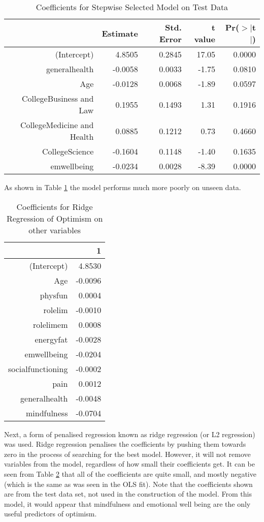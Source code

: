 \documentclass{article}
\begin{document}
\begin{table}[ht]
\centering
\begin{tabular}{rrrrr}
  \hline
 & Estimate & Std. Error & t value & Pr($>$$|$t$|$) \\ 
  \hline
(Intercept) & 4.8505 & 0.2845 & 17.05 & 0.0000 \\ 
  generalhealth & -0.0058 & 0.0033 & -1.75 & 0.0810 \\ 
  Age & -0.0128 & 0.0068 & -1.89 & 0.0597 \\ 
  CollegeBusiness and Law & 0.1955 & 0.1493 & 1.31 & 0.1916 \\ 
  CollegeMedicine and Health & 0.0885 & 0.1212 & 0.73 & 0.4660 \\ 
  CollegeScience & -0.1604 & 0.1148 & -1.40 & 0.1635 \\ 
  emwellbeing & -0.0234 & 0.0028 & -8.39 & 0.0000 \\ 
   \hline
\end{tabular}
\caption{Coefficients for Stepwise Selected Model on Test Data} 
\label{tab:hom1stepopttest}
\end{table}
As shown in Table \ref{tab:hom1stepopttest} the model performs much more poorly on unseen data. 

\begin{table}[ht]
\centering
\begin{tabular}{rr}
  \hline
 & 1 \\ 
  \hline
(Intercept) & 4.8530 \\ 
  Age & -0.0096 \\ 
  physfun & 0.0004 \\ 
  rolelim & -0.0010 \\ 
  rolelimem & 0.0008 \\ 
  energyfat & -0.0028 \\ 
  emwellbeing & -0.0204 \\ 
  socialfunctioning & -0.0002 \\ 
  pain & 0.0012 \\ 
  generalhealth & -0.0048 \\ 
  mindfulness & -0.0704 \\ 
   \hline
\end{tabular}
\caption{Coefficients for Ridge Regression of Optimism on other variables} 
\label{tab:hom1optridge}
\end{table}
Next, a form of penalised regression known as ridge regression (or L2 regression) was used. Ridge regression penalises the coefficients by pushing them towards zero in the process of searching for the best model. However, it will not remove variables from the model, regardless of how small their coefficients get. It can be seen from Table \ref{tab:hom1optridge} that all of the coefficients are quite small, and mostly negative (which is the same as was seen in the OLS fit). Note that the coefficients shown are from the test data set, not used in the construction of the model. From this model, it would appear that mindfulness and emotional well being are the only useful predictors of optimism. 
\end{document}

